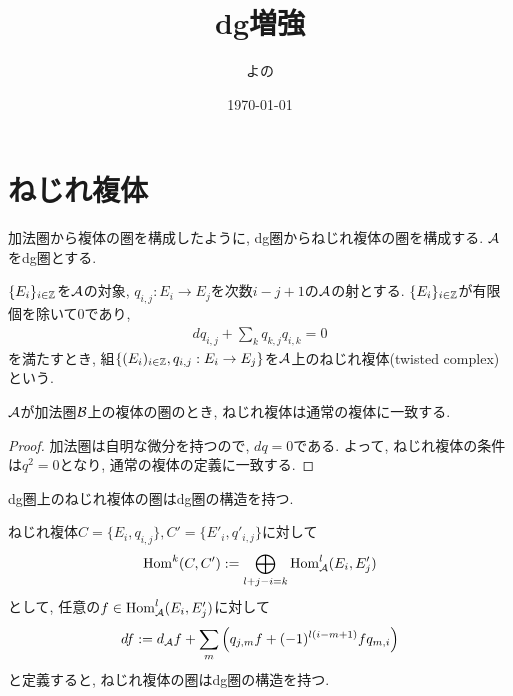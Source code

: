 \documentclass[uplatex, a4paper, 14Q, dvipdfmx]{jsarticle}
\title{dg増強}
\author{よの}
\date{\today}
\begin{document}
\maketitle

\begin{abstract}
  
\end{abstract}

\tableofcontents

\section{ねじれ複体}

加法圏から複体の圏を構成したように, dg圏からねじれ複体の圏を構成する. 
$\mathcal{A}$をdg圏とする. 

\begin{definition}[ねじれ複体]
  $\{E_i\}_{i \in \mathbb{Z}}$を$\mathcal{A}$の対象, $q_{i,j} : E_i \to E_j$を次数$i-j+1$の$\mathcal{A}$の射とする. 
  $\{E_i\}_{i \in \mathbb{Z}}$が有限個を除いて$0$であり,
  \begin{align*}
    dq_{i,j} + \sum_k q_{k,j}q_{i,k} = 0
  \end{align*}
  を満たすとき, 組$\{(E_i)_{i \in \mathbb{Z}}, q_{i,j} : E_i \to E_j\}$を$\mathcal{A}$上のねじれ複体(twisted complex)という.
\end{definition}

\begin{example}
  $\mathcal{A}$が加法圏$\mathcal{B}$上の複体の圏のとき, ねじれ複体は通常の複体に一致する. 
\end{example}

\begin{proof}
  加法圏は自明な微分を持つので, $dq = 0$である. 
  よって, ねじれ複体の条件は$q^2 = 0$となり, 通常の複体の定義に一致する. 
\end{proof}

dg圏上のねじれ複体の圏はdg圏の構造を持つ. 

\begin{lemma}
  ねじれ複体$C = \{E_i, q_{i,j}\}, C'=\{E'_i, q'_{i,j}\}$に対して
  \begin{align*}
    \mathrm{Hom}^k(C,C') := \bigoplus_{l+j-i=k} \mathrm{Hom}^l_{\mathcal{A}}(E_i,E'_j)
  \end{align*}
  として, 任意の$f \in \mathrm{Hom}^l_{\mathcal{A}}(E_i,E'_j)$に対して
  \begin{align*}
    df := d_{\mathcal{A}} f + \sum_m \qty(q_{j,m}f + (-1)^{l(i-m+1)}fq_{m,i})
  \end{align*}
  と定義すると, ねじれ複体の圏はdg圏の構造を持つ. 
\end{lemma}
\end{document}

